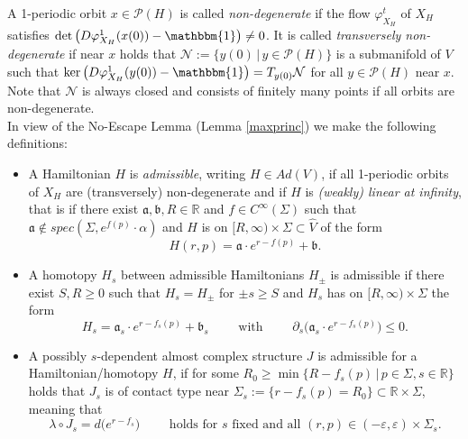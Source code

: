 \documentclass[a4paper,12pt,bibliography=totocnumbered,titlepage=false,abstracton,bookmarksnumbered=true]{scrartcl}
\newcommand{\veps}{\varepsilon}
\theoremstyle{definition}
\begin{document}
A 1-periodic orbit $x\in\mathcal{P}(H)$ is called \textit{non-degenerate} if the flow $\varphi^t_{X_H}$ of $X_H$ satisfies $\det \big(D\varphi^1_{X_H}(x(0))-\mathbbm{1}\big)\neq 0$. It is called \textit{transversely non-degenerate} if near $x$ holds that $\mathcal{N}:=\big\{y(0)\,\big|\,y\in\mathcal{P}(H)\big\}$ is a submanifold of $V$ such that $\ker\big(D\varphi^1_{X_H}(y(0))-\mathbbm{1}\big)=T_{y(0)}\mathcal{N}$ for all $y\in\mathcal{P}(H)$ near $x$. Note that $\mathcal{N}$ is always closed and consists of finitely many points if all orbits are non-degenerate.\\
In view of the No-Escape Lemma (Lemma \ref{maxprinc}) we make the following definitions:
\begin{itemize}
 \item A Hamiltonian $H$ is \emph{admissible}, writing $H\in Ad(V)$, if all 1-periodic orbits of $X_H$ are (transversely) non-degenerate and if $H$ is \emph{(weakly) linear at infinity}, that is if there exist $\mathfrak{a},\mathfrak{b},R\in\mathbb{R}$ and $f\in C^\infty(\Sigma)$ such that $\mathfrak{a}\not\in spec(\Sigma,e^{f(p)}{\cdot} \alpha)$ and $H$ is on $[R,\infty){\times}\Sigma\subset \widehat{V}$ of the form
 \[ H(r,p)=\mathfrak{a}\cdot e^{r-f(p)}+\mathfrak{b}.\]
 \item A homotopy $H_s$ between admissible Hamiltonians $H_\pm$ is admissible if there exist $S,R\geq0$ such that $H_s=H_\pm$ for $\pm s\geq S$ and $H_s$ has on $[R,\infty)\times\Sigma$ the form
 \[H_s=\mathfrak{a}_s\cdot e^{r-f_s(p)}+\mathfrak{b}_s \qquad \text{ with }\qquad \partial_s\big(\mathfrak{a}_s\cdot e^{r-f_s(p)}\big)\leq 0.\]
 \item A possibly $s$-dependent almost complex structure $J$ is admissible for a Hamiltonian/homotopy $H$, if for some $\displaystyle R_0\geq \min \{R-f_s(p)\,|\,p\in\Sigma,s\in\mathbb{R}\}$ holds that  $J_s$ is of contact type near $\Sigma_s:=\big\{r{-}f_s(p)=R_0\big\} \subset\mathbb{R}{\times}\Sigma$, meaning that
 \[\lambda\circ J_s=d\big(e^{r-f_s}\big) \qquad\text{ holds for $s$ fixed and all }(r,p)\in(-\veps,\veps){\times}\Sigma_s.\]
\end{itemize}
\end{document}
